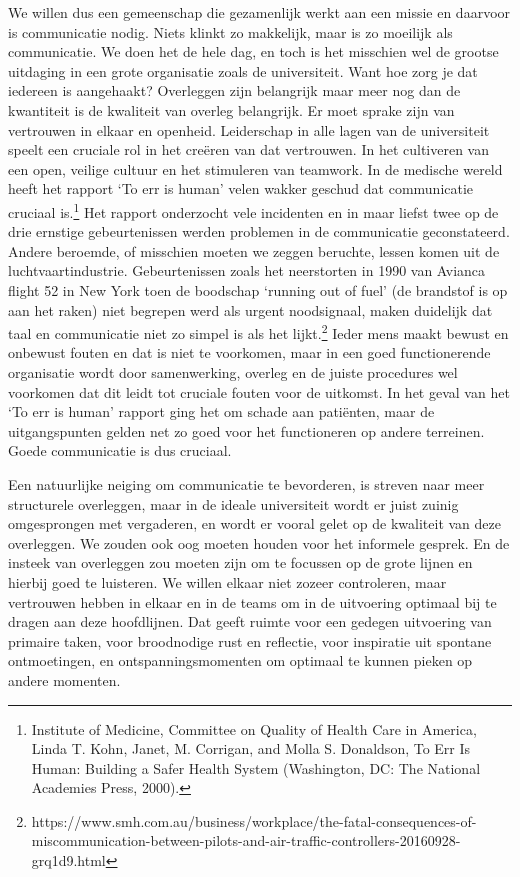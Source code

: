 \documentclass{jote-book}
\begin{document}
	We willen dus een gemeenschap die gezamenlijk werkt aan een missie en daarvoor is communicatie nodig. Niets klinkt zo makkelijk, maar is zo moeilijk als communicatie. We doen het de hele dag, en toch is het misschien wel de grootse uitdaging in een grote organisatie zoals de universiteit. Want hoe zorg je dat iedereen is aangehaakt? Overleggen zijn belangrijk maar meer nog dan de kwantiteit is de kwaliteit van overleg belangrijk. Er moet sprake zijn van vertrouwen in elkaar en openheid. Leiderschap in alle lagen van de universiteit speelt een cruciale rol in het creëren van dat vertrouwen. In het cultiveren van een open, veilige cultuur en het stimuleren van teamwork. In de medische wereld heeft het rapport ‘To err is human' velen wakker geschud dat communicatie cruciaal is.\footnote{Institute of Medicine, Committee on Quality of Health Care in America, Linda T. Kohn, Janet, M. Corrigan, and Molla S. Donaldson, To Err Is Human: Building a Safer Health System (Washington, DC: The National Academies Press, 2000).} Het rapport onderzocht vele incidenten en in maar liefst twee op de drie ernstige gebeurtenissen werden problemen in de communicatie geconstateerd. Andere beroemde, of misschien moeten we zeggen beruchte, lessen komen uit de luchtvaartindustrie. Gebeurtenissen zoals het neerstorten in 1990 van Avianca flight 52 in New York toen de boodschap ‘running out of fuel' (de brandstof is op aan het raken) niet begrepen werd als urgent noodsignaal, maken duidelijk dat taal en communicatie niet zo simpel is als het lijkt.\footnote{https://www.smh.com.au/business/workplace/the-fatal-consequences-of-miscommunication-between-pilots-and-air-traffic-controllers-20160928-grq1d9.html} Ieder mens maakt bewust en onbewust fouten en dat is niet te voorkomen, maar in een goed functionerende organisatie wordt door samenwerking, overleg en de juiste procedures wel voorkomen dat dit leidt tot cruciale fouten voor de uitkomst. In het geval van het ‘To err is human' rapport ging het om schade aan patiënten, maar de uitgangspunten gelden net zo goed voor het functioneren op andere terreinen. Goede communicatie is dus cruciaal.



	Een natuurlijke neiging om communicatie te bevorderen, is streven naar meer structurele overleggen, maar in de ideale universiteit wordt er juist zuinig omgesprongen met vergaderen, en wordt er vooral gelet op de kwaliteit van deze overleggen. We zouden ook oog moeten houden voor het informele gesprek. En de insteek van overleggen zou moeten zijn om te focussen op de grote lijnen en hierbij goed te luisteren. We willen elkaar niet zozeer controleren, maar vertrouwen hebben in elkaar en in de teams om in de uitvoering optimaal bij te dragen aan deze hoofdlijnen. Dat geeft ruimte voor een gedegen uitvoering van primaire taken, voor broodnodige rust en reflectie, voor inspiratie uit spontane ontmoetingen, en ontspanningsmomenten om optimaal te kunnen pieken op andere momenten.
\end{document}
